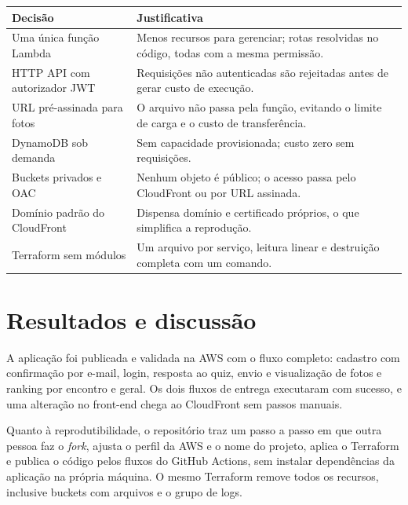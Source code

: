 \documentclass[article, 12pt, oneside, a4paper, english, brazil, sumario=tradicional]{abntex2}
\begin{document}
\begin{quadro}[htb]
  \caption{\label{qua:decisoes}Principais decisões técnicas}
  \begin{tabular}{|>{\raggedright\arraybackslash}p{4.2cm}|>{\raggedright\arraybackslash}p{10.5cm}|}
    \hline
    \textbf{Decisão} & \textbf{Justificativa} \\ \hline
    Uma única função Lambda & Menos recursos para gerenciar; rotas resolvidas no código, todas com a mesma permissão. \\ \hline
    HTTP API com autorizador JWT & Requisições não autenticadas são rejeitadas antes de gerar custo de execução. \\ \hline
    URL pré-assinada para fotos & O arquivo não passa pela função, evitando o limite de carga e o custo de transferência. \\ \hline
    DynamoDB sob demanda & Sem capacidade provisionada; custo zero sem requisições. \\ \hline
    Buckets privados e OAC & Nenhum objeto é público; o acesso passa pelo CloudFront ou por URL assinada. \\ \hline
    Domínio padrão do CloudFront & Dispensa domínio e certificado próprios, o que simplifica a reprodução. \\ \hline
    Terraform sem módulos & Um arquivo por serviço, leitura linear e destruição completa com um comando. \\ \hline
  \end{tabular}
\end{quadro}

\section{Resultados e discussão}\label{sec:resultados}

A aplicação foi publicada e validada na AWS com o fluxo completo: cadastro com confirmação por e-mail, login, resposta ao quiz, envio e visualização de fotos e ranking por encontro e geral. Os dois fluxos de entrega executaram com sucesso, e uma alteração no front-end chega ao CloudFront sem passos manuais.

Quanto à reprodutibilidade, o repositório traz um passo a passo em que outra pessoa faz o \textit{fork}, ajusta o perfil da AWS e o nome do projeto, aplica o Terraform e publica o código pelos fluxos do GitHub Actions, sem instalar dependências da aplicação na própria máquina. O mesmo Terraform remove todos os recursos, inclusive buckets com arquivos e o grupo de logs.
\end{document}
